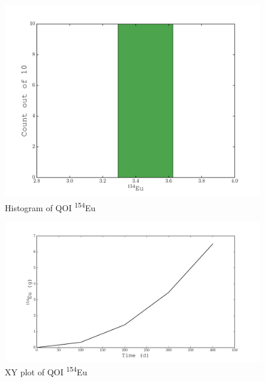 \documentclass[11pt,notitlepage]{article}
\newcommand{\tss}{\textsuperscript}
\begin{document}
  \begin{figure}[H]
    \begin{center}
      \includegraphics[width=0.77\columnwidth]{../Origen2/PLOTS/EU154Post_HIST.pdf}
      \vspace{-5mm}
      \caption{Histogram of QOI \tss{154}Eu}
      \label{fig:POSTHISTEu154}
    \end{center}
  \end{figure}

    \begin{figure}[H]
    \begin{center}
      \includegraphics[width=0.77\columnwidth]{../Origen2/PLOTS/EU154Post_XY.pdf}
      \vspace{-5mm}
      \caption{XY plot of QOI \tss{154}Eu}
      \label{fig:POSTXYEu154}
    \end{center}
  \end{figure}
\end{document}
